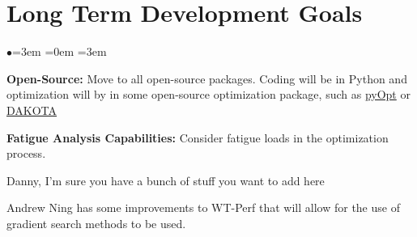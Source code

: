 \documentclass[12pt]{article}
\begin{document}
\section{Long Term Development Goals}
\begin{list}{$\bullet$}{\leftmargin=3em \itemindent=0em \rightmargin=3em}
    \item \textbf{Open-Source:} Move to all open-source packages. Coding will be in Python and optimization will by in some open-source optimization package, such as \href{http://www.pyopt.org/}{\color{blue}pyOpt} or  \href{http://dakota.sandia.gov/software.html}{\color{blue}DAKOTA}
    \item \textbf{Fatigue Analysis Capabilities:} Consider fatigue loads in the optimization process. 
	\item Danny, I'm sure you have a bunch of stuff you want to add here
	\item Andrew Ning has some improvements to WT-Perf that will allow for the use of gradient search methods to be used.
\end{list}
\end{document}
